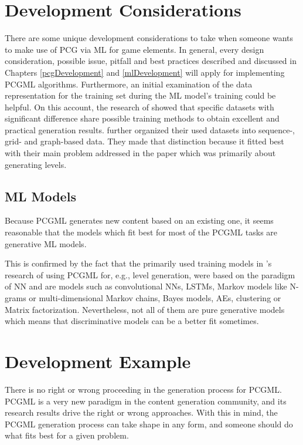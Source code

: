 \documentclass[MGS,Master,english]{twbook}%
\begin{document}
\section{Development Considerations} \label{PCGML::devConsiderations}
There are some unique development considerations to take when someone wants to make use of \ac{PCG} via \ac{ML} for game elements. In general, every design consideration, possible issue, pitfall and best practices described and discussed in Chapters \ref{pcgDevelopment} and \ref{mlDevelopment} will apply for implementing \ac{PCGML} algorithms. Furthermore, an initial examination of the data representation for the training set during the \ac{ML} model’s training could be helpful. On this account, the research of \citep{pcgml::paper} showed that specific datasets with significant difference share possible training methods to obtain excellent and practical generation results. \citep{pcgml::paper} further organized their used datasets into sequence-, grid- and graph-based data. They made that distinction because it fitted best with their main problem addressed in the paper which was primarily about generating levels.

\subsection{\acl{ML} Models}
Because \ac{PCGML} generates new content based on an existing one, it seems reasonable that the models which fit best for most of the \ac{PCGML} tasks are generative \ac{ML} models.

This is confirmed by the fact that the primarily used training models in 's research of using \ac{PCGML} for, e.g., level generation, were based on the paradigm of \ac{NN} and are models such as convolutional \acp{NN}, \acp{LSTM}, Markov models like N-grams or multi-dimensional Markov chains, Bayes models, \acp{AE}, clustering or Matrix factorization. Nevertheless, not all of them are pure generative models which means that discriminative models can be a better fit sometimes.

\section{Development Example} \label{PCGML::devExample}
There is no right or wrong proceeding in the generation process for \ac{PCGML}. \ac{PCGML} is a very new paradigm in the content generation community, and its research results drive the right or wrong approaches. With this in mind, the \ac{PCGML} generation process can take shape in any form, and someone should do what fits best for a given problem.
\end{document}
